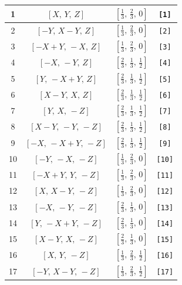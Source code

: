 \documentclass[fleqn,8pt]{jsarticle}
\begin{document}
\begin{longtable}{cccc}
1 & $\left[ X,\, Y,\, Z \right]$ & $\left[ \frac{1}{3},\, \frac{2}{3},\, 0 \right]$ & {\tt [1]} \\ \hline
2 & $\left[ - Y,\, X - Y,\, Z \right]$ & $\left[ \frac{1}{3},\, \frac{2}{3},\, 0 \right]$ & {\tt [2]} \\ \hline
3 & $\left[ - X + Y,\, - X,\, Z \right]$ & $\left[ \frac{1}{3},\, \frac{2}{3},\, 0 \right]$ & {\tt [3]} \\ \hline
4 & $\left[ - X,\, - Y,\, Z \right]$ & $\left[ \frac{2}{3},\, \frac{1}{3},\, \frac{1}{2} \right]$ & {\tt [4]} \\ \hline
5 & $\left[ Y,\, - X + Y,\, Z \right]$ & $\left[ \frac{2}{3},\, \frac{1}{3},\, \frac{1}{2} \right]$ & {\tt [5]} \\ \hline
6 & $\left[ X - Y,\, X,\, Z \right]$ & $\left[ \frac{2}{3},\, \frac{1}{3},\, \frac{1}{2} \right]$ & {\tt [6]} \\ \hline
7 & $\left[ Y,\, X,\, - Z \right]$ & $\left[ \frac{2}{3},\, \frac{1}{3},\, \frac{1}{2} \right]$ & {\tt [7]} \\ \hline
8 & $\left[ X - Y,\, - Y,\, - Z \right]$ & $\left[ \frac{2}{3},\, \frac{1}{3},\, \frac{1}{2} \right]$ & {\tt [8]} \\ \hline
9 & $\left[ - X,\, - X + Y,\, - Z \right]$ & $\left[ \frac{2}{3},\, \frac{1}{3},\, \frac{1}{2} \right]$ & {\tt [9]} \\ \hline
10 & $\left[ - Y,\, - X,\, - Z \right]$ & $\left[ \frac{1}{3},\, \frac{2}{3},\, 0 \right]$ & {\tt [10]} \\ \hline
11 & $\left[ - X + Y,\, Y,\, - Z \right]$ & $\left[ \frac{1}{3},\, \frac{2}{3},\, 0 \right]$ & {\tt [11]} \\ \hline
12 & $\left[ X,\, X - Y,\, - Z \right]$ & $\left[ \frac{1}{3},\, \frac{2}{3},\, 0 \right]$ & {\tt [12]} \\ \hline
13 & $\left[ - X,\, - Y,\, - Z \right]$ & $\left[ \frac{2}{3},\, \frac{1}{3},\, 0 \right]$ & {\tt [13]} \\ \hline
14 & $\left[ Y,\, - X + Y,\, - Z \right]$ & $\left[ \frac{2}{3},\, \frac{1}{3},\, 0 \right]$ & {\tt [14]} \\ \hline
15 & $\left[ X - Y,\, X,\, - Z \right]$ & $\left[ \frac{2}{3},\, \frac{1}{3},\, 0 \right]$ & {\tt [15]} \\ \hline
16 & $\left[ X,\, Y,\, - Z \right]$ & $\left[ \frac{1}{3},\, \frac{2}{3},\, \frac{1}{2} \right]$ & {\tt [16]} \\ \hline
17 & $\left[ - Y,\, X - Y,\, - Z \right]$ & $\left[ \frac{1}{3},\, \frac{2}{3},\, \frac{1}{2} \right]$ & {\tt [17]} \\ \hline

\end{longtable}
\end{document}
